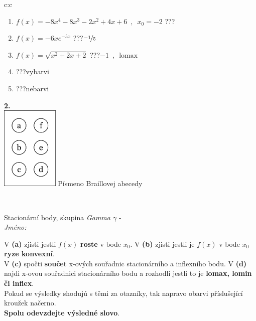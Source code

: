 \documentclass[10pt]{report}
\begin{document}
\begin{tabular}{c:c}
\begin{minipage}[c][104.5mm][t]{0.5\linewidth}
\begin{center}
\begin{minipage}{0.79\linewidth}
\begin{center}
\begin{varwidth}{\linewidth}
\begin{enumerate}
\item $f(x)=-8x^4-8x^3-2x^2+4x+6\enspace , \enspace x_0=-2$\quad \dotfill\; ???\;\dotfill \quad {}
\item $f(x)=-6xe^{-5x}$\quad \dotfill\; ???\;\dotfill \quad $\nicefrac{-1}{5}$
\item $f(x)=\sqrt{x^2+2x+2}$\quad \dotfill\; ???\;\dotfill \quad $-1\enspace , \enspace\mathrm{lomax}$
\item \quad \dotfill\; ???\;\dotfill \quad vybarvi
\item \quad \dotfill\; ???\;\dotfill \quad nebarvi
\end{enumerate}
\end{varwidth}
\end{center}
\end{minipage}
\begin{minipage}{0.20\linewidth}
\begin{center}
{\Huge\bfseries 2.} \\[2mm]
\includegraphics[height=40mm]{../images/braille.png}
{\small Písmeno Braillovej abecedy}
\end{center}
\end{minipage}
\end{center}
\end{minipage}
\\ \hdashline
\begin{minipage}[c][104.5mm][t]{0.5\linewidth}
\begin{center}
\vspace{7mm}
{\huge Stacionární body, skupina \textit{Gamma $\gamma$} -}\\[5mm]
\textit{Jméno:}\phantom{xxxxxxxxxxxxxxxxxxxxxxxxxxxxxxxxxxxxxxxxxxxxxxxxxxxxxxxxxxxxxxxxx}\\[5mm]
\begin{minipage}{0.95\linewidth}
\begin{center}
{\small V \textbf{(a)} zjisti jestli $f(x)$ \textbf{roste} v bode $x_0$. V \textbf{(b)} zjisti jestli je $f(x)$ v bode $x_0$ \textbf{ryze konvexní}.\\V \textbf{(c)} spočti \textbf{součet} x-ových souřadnic stacionárního a inflexního bodu. V \textbf{(d)} najdi x-ovou souřadnici stacionárního bodu a rozhodli jestli to je \textbf{lomax, lomin či inflex}.\\Pokud se výsledky shodujú s těmi za otazníky, tak napravo obarvi příslušející kroužek načerno.\\\textbf{Spolu odevzdejte výsledné slovo}}.

\end{center}
\end{minipage}
\end{center}
\end{minipage}
\end{tabular}
\end{document}
